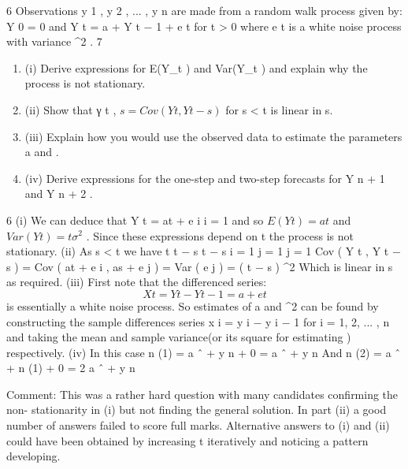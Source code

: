 \documentclass[a4paper,12pt]{article}
\begin{document}
 


6
Observations y 1 , y 2 , ... , y n are made from a random walk process given by:
Y 0 = 0 and Y t = a + Y t − 1 + e t for t > 0
where e t is a white noise process with variance \sigma^2 .
7

\begin{enumerate}
\item (i) Derive expressions for E(Y_{t} ) and Var(Y_{t} ) and explain why the process is not
stationary.
\item 
(ii) Show that γ t , $s = Cov ( Y t , Y t − s )$ for s < t is linear in s.
\item
(iii) Explain how you would use the observed data to estimate the parameters a
and \sigma.
\item 
(iv) Derive expressions for the one-step and two-step forecasts for Y n + 1 and Y n + 2 .
\end{enumerate}

6
(i)
We can deduce that Y t = at + \sum e i
i = 1
and so $E ( Y t ) = at$ and
$Var ( Y t ) = t \sigma^2$ .
Since these expressions depend on t the process is not stationary.
(ii)
As s < t we have
t t − s t − s
i = 1 j = 1 j = 1
Cov ( Y t , Y t − s ) = Cov ( at + \sum e i , as + \sum e j ) = Var ( \sum e j ) = ( t − s ) \sigma^2
Which is linear in s as required.
(iii)
First note that the differenced series:
\[X t = Y t − Y t − 1 = a + e t\]
is essentially a white noise process. So estimates of a and \sigma^2 can be found by constructing the sample differences series x i = y i − y i − 1 for i = 1, 2, ... , n and
taking the mean and sample variance(or its square for estimating )
respectively.
(iv)
In this case  n (1) = a ˆ + y n + 0 = a ˆ + y n
And  n (2) = a ˆ +  n (1) + 0 = 2 a ˆ + y n

\newpage
Comment: This was a rather hard question with many candidates confirming the non-
stationarity in (i) but not finding the general solution. In part (ii) a good number of answers
failed to score full marks. Alternative answers to (i) and (ii) could have been obtained by
increasing t iteratively and noticing a pattern developing.


\end{document}
